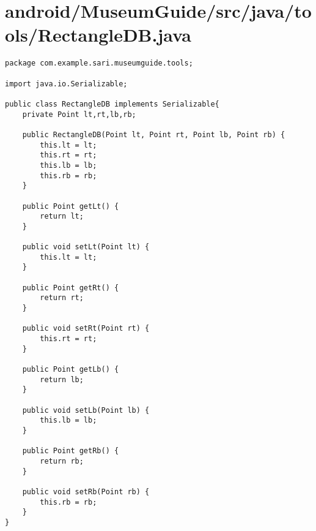 \section{android/MuseumGuide/src/java/tools/RectangleDB.java}
\begin{lstlisting}package com.example.sari.museumguide.tools;

import java.io.Serializable;

public class RectangleDB implements Serializable{
    private Point lt,rt,lb,rb;

    public RectangleDB(Point lt, Point rt, Point lb, Point rb) {
        this.lt = lt;
        this.rt = rt;
        this.lb = lb;
        this.rb = rb;
    }

    public Point getLt() {
        return lt;
    }

    public void setLt(Point lt) {
        this.lt = lt;
    }

    public Point getRt() {
        return rt;
    }

    public void setRt(Point rt) {
        this.rt = rt;
    }

    public Point getLb() {
        return lb;
    }

    public void setLb(Point lb) {
        this.lb = lb;
    }

    public Point getRb() {
        return rb;
    }

    public void setRb(Point rb) {
        this.rb = rb;
    }
}
\end{lstlisting}
\newpage
